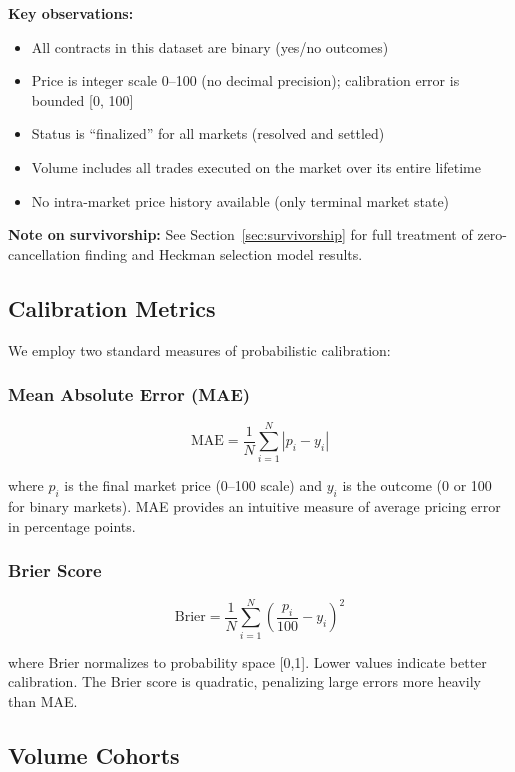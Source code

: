 \documentclass[12pt,letterpaper]{article}
\begin{document}
\textbf{Key observations:}
\begin{itemize}
    \item All contracts in this dataset are binary (yes/no outcomes)
    \item Price is integer scale 0--100 (no decimal precision); calibration error is bounded [0, 100]
    \item Status is ``finalized'' for all markets (resolved and settled)
    \item Volume includes all trades executed on the market over its entire lifetime
    \item No intra-market price history available (only terminal market state)
\end{itemize}

\textbf{Note on survivorship:} See Section~\ref{sec:survivorship} for full treatment of zero-cancellation finding and Heckman selection model results.

\subsection{Calibration Metrics}

We employ two standard measures of probabilistic calibration:

\subsubsection{Mean Absolute Error (MAE)}

$$\text{MAE} = \frac{1}{N} \sum_{i=1}^{N} |p_i - y_i|$$

where $p_i$ is the final market price (0--100 scale) and $y_i$ is the outcome (0 or 100 for binary markets). MAE provides an intuitive measure of average pricing error in percentage points.

\subsubsection{Brier Score}

$$\text{Brier} = \frac{1}{N} \sum_{i=1}^{N} \left(\frac{p_i}{100} - y_i\right)^2$$

where Brier normalizes to probability space [0,1]. Lower values indicate better calibration. The Brier score is quadratic, penalizing large errors more heavily than MAE.

\subsection{Volume Cohorts}
\end{document}
